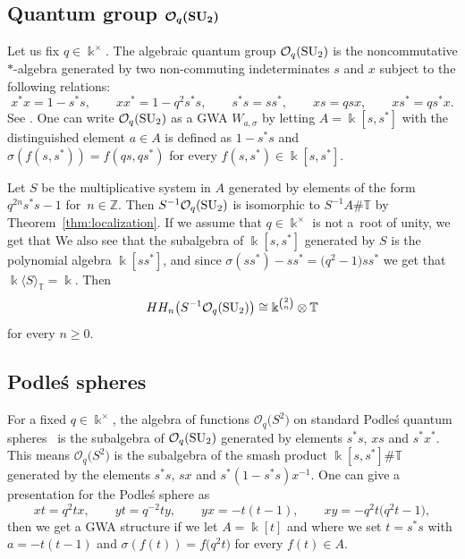 \documentclass[pdftex]{sigma}
\newcommand{\C}[1]{\mathcal{#1}}
\newcommand{\B}[1]{\mathbb{#1}}
\newcommand{\CH}{{\rm CH}}
\renewcommand{\geq}{\geqslant}
\numberwithin{equation}{section}
\begin{document}
\subsection[Quantum group CO\_q(SU\_2)]{Quantum group $\boldsymbol{\C{O}_q({\rm SU}_2)}$}\label{sect:OqSU2}

Let us fix $q\in\Bbbk^\times$. The algebraic quantum group $\C{O}_q({\rm SU}_2)$ is the
noncommutative $*$-algebra generated by two non-commuting indeterminates $s$ and $x$ subject
to the following relations:
\[%
 x^*x = 1 - s^*s, \qquad x x^* = 1 - q^2 s^*s, \qquad s^*s = s s^*,\qquad xs =
 qsx,\qquad xs^*=qs^*x.
\]
See \cite[p.~4]{Hadfield:Podles}. One can write $\C{O}_q({\rm SU}_2)$ as a GWA $W_{a,\sigma}$ by
letting $A=\Bbbk[s,s^*]$ with the distinguished element $a\in A$ is defined as $1-s^*s$ and
$\sigma(f(s,s^*))= f(qs,qs^*)$ for every $f(s,s^*)\in\Bbbk[s,s^*]$.

Let $S$ be the multiplicative system in $A$ generated by elements of the form $q^{2n}s^*s-1$ for~${n\in\B{Z}}$. Then $S^{-1}\C{O}_q({\rm SU}_2)$ is isomorphic to $S^{-1}A\# \B{T}$ by
Theorem~\ref{thm:localization}. If we assume that $q\in \Bbbk^\times$ is not a~root of unity, we get
that
\smash{$
 \CH_*\bigl(S^{-1}A\bigr)^{\B{T}} = \CH_*(\Bbbk) = \CH_*(A)_{\B{T}}
$}
We also see that the subalgebra of $\Bbbk[s,s^*]$ generated by $S$ is the polynomial algebra
$\Bbbk[ss^*]$, and since $\sigma(ss^*)-ss^* = \bigl(q^2-1\bigr)ss^*$ we get that
$\Bbbk\langle S\rangle_{\B{T}} = \Bbbk$. Then
\[
 HH_n\bigl(S^{-1}\C{O}_q({\rm SU}_2)\bigr) \cong \Bbbk^{\binom{2}{n}}\otimes\B{T}
\]
for every $n\geq 0$.

\subsection{Podle\'s spheres}\label{sect:PodlesSphere}

For a fixed $q\in\Bbbk^\times$, the algebra of functions $\C{O}_q\bigl(S^2\bigr)$ on standard Podle\'s
quantum spheres~\cite{Hadfield:Podles,Podl87} is the subalgebra of $\C{O}_q({\rm SU}_2)$
generated by elements $s^*s$, $xs$ and $s^*x^*$. This means $\C{O}_q\bigl(S^2\bigr)$ is the
subalgebra of the smash product $\Bbbk[s,s^*]\# \B{T}$ generated by the elements $s^*s$,
$sx$ and $s^*(1-s^*s)x^{-1}$. One can give a presentation for the Podle\'s sphere as
\[%
xt = q^2tx, \qquad yt = q^{-2} ty, \qquad yx = -t(t-1), \qquad xy =
-q^2t\bigl(q^2t-1\bigr),
\]
 then we get a GWA structure if we let $A = \Bbbk[t]$ and where we set
$t=s^*s$ with $a=-t(t-1)$ and $\sigma(f(t)) = f\bigl(q^2 t\bigr)$ for every $f(t)\in A$.
\end{document}
